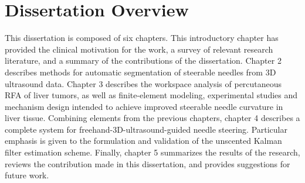 \section{Dissertation Overview}
This dissertation is composed of six chapters. This introductory chapter has provided the clinical motivation for the work, a survey of relevant research literature, and a summary of the contributions of the dissertation. Chapter 2 describes methods for automatic segmentation of steerable needles from 3D ultrasound data. Chapter 3 describes the workspace analysis of percutaneous RFA of liver tumors, as well as finite-element modeling, experimental studies and mechanism design intended to achieve improved steerable needle curvature in liver tissue. Combining elements from the previous chapters, chapter 4 describes a complete system for freehand-3D-ultrasound-guided needle steering. Particular emphasis is given to the formulation and validation of the unscented Kalman filter estimation scheme.  Finally, chapter 5 summarizes the results of the research, reviews the contribution made in this dissertation, and provides suggestions for future work.